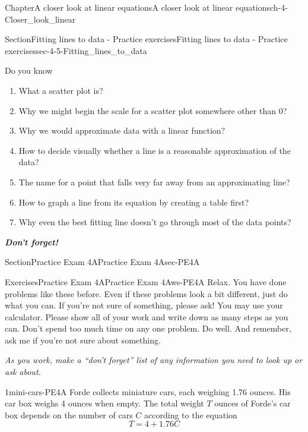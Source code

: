 \documentclass[twoside,11pt,]{book}
\newcommand{\alert}[1]{\textbf{\textit{#1}}}
\numberwithin{equation}{section}
\begin{document}
\begin{chapterptx}{Chapter}{A closer look at linear equations}{}{A closer look at linear equations}{}{}{ch-4-Closer_look_linear}
\begin{sectionptx}{Section}{Fitting lines to data - Practice exercises}{}{Fitting lines to data - Practice exercises}{}{}{sec-4-5-Fitting_lines_to_data}
\begin{conclusion}{Do you know \textellipsis{}}
%
\begin{enumerate}[label={\Alph*.}]
\item{}What a scatter plot is?%
\item{}Why we might begin the scale for a scatter plot somewhere other than 0?%
\item{}Why we would approximate data with a linear function?%
\item{}How to decide visually whether a line is a reasonable approximation of the data?%
\item{}The name for a point that falls very far away from an approximating line?%
\item{}How to graph a line from its equation by creating a table first?%
\item{}Why even the best fitting line doesn't go through most of the data points?%
\end{enumerate}
%
\par
\alert{Don't forget!}%
\end{conclusion}%
\end{sectionptx}
%
%
\typeout{************************************************}
\typeout{************************************************}
%
\begin{sectionptx}{Section}{Practice Exam 4A}{}{Practice Exam 4A}{}{}{sec-PE4A}
%
%
\typeout{************************************************}
\typeout{************************************************}
%
\begin{exercises-subsection-numberless}{Exercises}{Practice Exam 4A}{}{Practice Exam 4A}{}{}{ws-PE4A}
Relax. You have done problems like these before. Even if these problems look a bit different, just do what you can. If you're not sure of something, please ask! You may use your calculator. Please show all of your work and write down as many steps as you can. Don't spend too much time on any one problem. Do well. And remember, ask me if you're not sure about something.%
 \par
\emph{As you work, make a ``don't forget'' list of any information you need to look up or ask about.}%
 \begin{divisionexercise}{1}{}{}{mini-cars-PE4A}%
Forde collects miniature cars, each weighing 1.76 ounces. His car box weighs 4 ounces when empty. The total weight \(T\) ounces of Forde's car box depends on the number of cars \(C\) according to the equation%
\begin{equation*}
T=4+1.76C
\end{equation*}

\end{divisionexercise}
\end{exercises-subsection-numberless}
\end{sectionptx}
\end{chapterptx}
\end{document}
